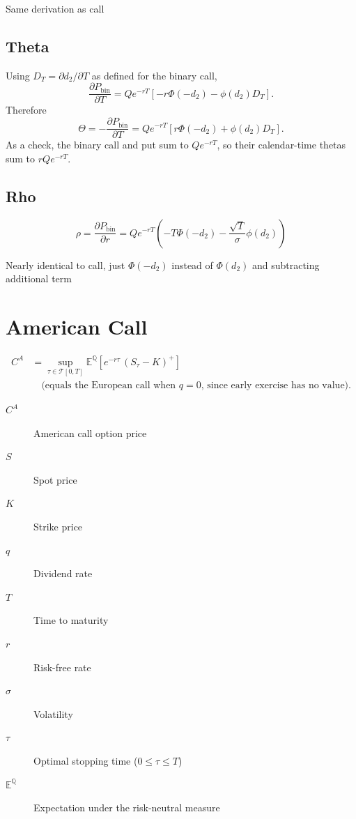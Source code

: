 \documentclass[12pt,a4paper]{article}
\begin{document}
Same derivation as call

\subsection{Theta}
Using $D_T=\partial d_2/\partial T$ as defined for the binary call,
\[
  \frac{\partial P_{\mathrm{bin}}}{\partial T}
    = Qe^{-rT}\left[-r\Phi(-d_2)-\phi(d_2)D_T\right].
\]
Therefore
\[
  \boxed{\Theta = -\frac{\partial P_{\mathrm{bin}}}{\partial T}
    = Qe^{-rT}\left[r\Phi(-d_2)+\phi(d_2)D_T\right]}.
\]
As a check, the binary call and put sum to $Qe^{-rT}$, so their
calendar-time thetas sum to $rQe^{-rT}$.

\subsection{Rho}
\[
  \boxed{\rho = \frac{\partial P_{\mathrm{bin}}}{\partial r} = Qe^{-rT}\!\left(-T\Phi(-d_2) - \frac{\sqrt{T}}{\sigma}\phi(d_2)\right)}
\]

Nearly identical to call, just $\Phi(-d_2)$ instead of $\Phi(d_2)$ and subtracting additional term

\newpage

\section{American Call}

\[
  \begin{aligned}
    C^{A} & = \sup_{\tau \in \mathcal{T}[0,T]} \mathbb{E}^{\mathbb{Q}}\!\left[ e^{-r \tau}\,(S_{\tau}-K)^{+} \right] \\[4pt]
          & \quad \text{(equals the European call when $q=0$, since early exercise has no value).}
  \end{aligned}
\]

\begin{description}
  \item[$C^{A}$] American call option price
  \item[$S$] Spot price
  \item[$K$] Strike price
  \item[$q$] Dividend rate
  \item[$T$] Time to maturity
  \item[$r$] Risk-free rate
  \item[$\sigma$] Volatility
  \item[$\tau$] Optimal stopping time (\( 0 \le \tau \le T \))
  \item[$\mathbb{E}^{\mathbb{Q}}$] Expectation under the risk-neutral measure
\end{description}
\end{document}
